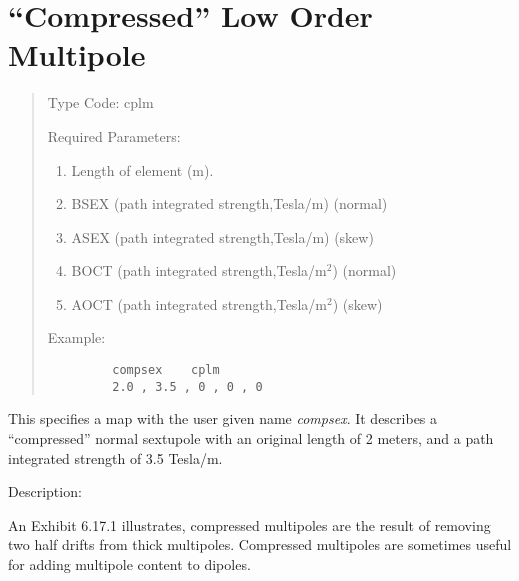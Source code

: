 \section{``Compressed'' Low Order Multipole}
\begin{quotation}
\noindent Type Code:  cplm
\vspace{5mm}

\noindent Required Parameters:
\begin{enumerate}
      \item  Length of element (m).
      \item  BSEX (path integrated strength,Tesla/m) \hspace{1em} (normal)
      \item  ASEX (path integrated strength,Tesla/m) \hspace{1em} (skew)
      \item  BOCT (path integrated strength,Tesla/$\mbox{m}^2$) \hspace{1em} (normal)
      \item  AOCT (path integrated strength,Tesla/$\mbox{m}^2$) \hspace{1em} (skew)
\end{enumerate}

\vspace{5mm}
\noindent Example:
\begin{verbatim}
         compsex    cplm
         2.0 , 3.5 , 0 , 0 , 0
\end{verbatim}
\end{quotation}
This specifies a map with the user given name {\em compsex}.
  It describes a
``compressed'' normal sextupole with an original length of 2 meters, and a
path integrated strength of 3.5 Tesla/m.

\vspace{5mm}
     Description:
\vspace{2mm}

     An Exhibit 6.17.1 illustrates, compressed multipoles are the result of removing two half drifts from thick multipoles.  Compressed multipoles are sometimes useful for adding multipole content to dipoles.

